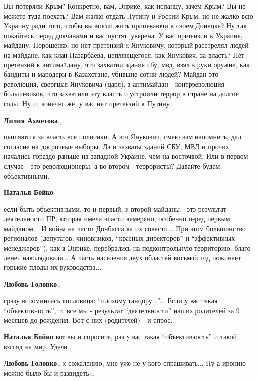 \begin{itemize}

Вы потеряли Крым? Конкретно, вам, Энрике, как испанцу, зачем Крым? Вы не можете
туда поехать? Вам жалко отдать Путину и России Крым, но не жалко всю Украину
ради того, чтобы вы могли жить припеваючи в своем Донецке? Ну так покайтесь
перед дончанами и вас пустят, уверена. У вас претензии к Украине, майдану,
Порошенко, но нет претензий к Януковичу, который расстрелял людей на майдане,
как клан Назарбаева, цепляющегося, как Янукович, за власть? Нет претензий к
антимайдану, что захватил здания сбу, мвд, взял в руки оружие, как бандиты и
мародеры в Казахстане, убившие сотни людей? Майдан-это революция, свергшая
Януковича (царя), а антимайдан - контрреволюция большевиков, что захватили эту
власть и устроили террор в стране на долгие годы. Ну и, конечно же, у вас нет
претензий к Путину.

\begin{itemize} %
\textbf{Лилия Ахметова},, 

цепляются за власть все политики. А вот Янукович, смею вам напомнить, дал
согласие на досрочные выборы. Да и захваты зданий СБУ, МВД и прочих начались
гораздо раньше на западной Украине, чем на восточной. Или в первом случае - это
революционеры, а во втором - террористы? Давайте будем объективными.


\textbf{Наталья Бойко} 

если быть объективными, то и первый, и второй майданы - это результат
деятельности ПР, которая имела власти немеряно, особенно перед первым
майданом... И война на части Донбасса на их совести... При этом большинство
регионалов (депутатов, чиновников, \enquote{красных директоров} и \enquote{эффективных
менеджеров}), как и Энрике, перебрались на подконтрольную территорию, благо
денег наколядовали... А часть населения двух областей восьмой год пожинает
горькие плоды их руководства...

\textbf{Любовь Головко},, 

сразу вспомнилась пословица: \enquote{плохому танцору...}... Если у вас такая
\enquote{объективность}, то все мы - результат \enquote{деятельности} наших родителей за 9
месяцев до рождения. Вот с них (родителей) - и спрос.

\textbf{Наталья Бойко} вот вы и спросите, раз у вас такая \enquote{объективность} и такой взгляд на мир. Удачи.

\textbf{Любовь Головко},, к сожалению, мне уже не у кого спрашивать... Ну а иронию можно было бы и развидеть...
\end{itemize} %


\end{itemize}
